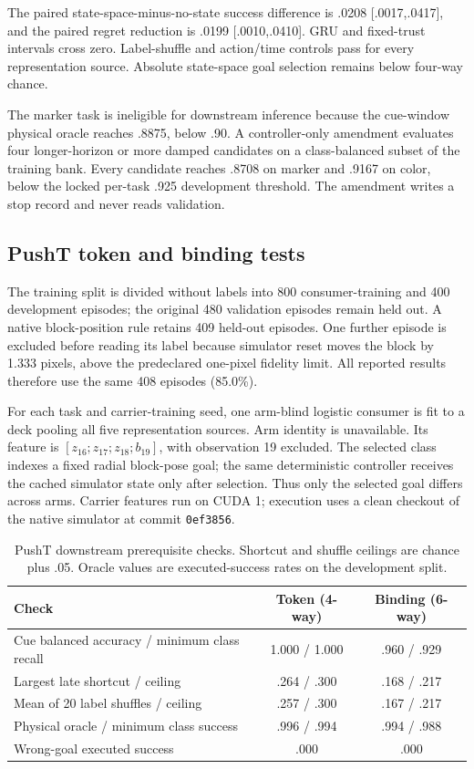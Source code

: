 The paired state-space-minus-no-state success difference is .0208 [.0017,.0417], and the paired regret reduction is .0199 [.0010,.0410]. GRU and fixed-trust intervals cross zero. Label-shuffle and action/time controls pass for every representation source. Absolute state-space goal selection remains below four-way chance.

The marker task is ineligible for downstream inference because the cue-window physical oracle reaches .8875, below .90. A controller-only amendment evaluates four longer-horizon or more damped candidates on a class-balanced subset of the training bank. Every candidate reaches .8708 on marker and .9167 on color, below the locked per-task .925 development threshold. The amendment writes a stop record and never reads validation.

\subsection{PushT token and binding tests}

The training split is divided without labels into 800 consumer-training and 400 development episodes; the original 480 validation episodes remain held out. A native block-position rule retains 409 held-out episodes. One further episode is excluded before reading its label because simulator reset moves the block by 1.333 pixels, above the predeclared one-pixel fidelity limit. All reported results therefore use the same 408 episodes (85.0\%).

For each task and carrier-training seed, one arm-blind logistic consumer is fit to a deck pooling all five representation sources. Arm identity is unavailable. Its feature is $[z_{16};z_{17};z_{18};b_{19}]$, with observation 19 excluded. The selected class indexes a fixed radial block-pose goal; the same deterministic controller receives the cached simulator state only after selection. Thus only the selected goal differs across arms. Carrier features run on CUDA 1; execution uses a clean checkout of the native simulator at commit \texttt{0ef3856}.

\begin{table}[H]
\centering
\scriptsize
\setlength{\tabcolsep}{4.2pt}
\caption{PushT downstream prerequisite checks. Shortcut and shuffle ceilings are chance plus .05. Oracle values are executed-success rates on the development split.}
\begin{tabular}{lcc}
\toprule
Check & Token (4-way) & Binding (6-way) \\
\midrule
Cue balanced accuracy / minimum class recall & 1.000 / 1.000 & .960 / .929 \\
Largest late shortcut / ceiling & .264 / .300 & .168 / .217 \\
Mean of 20 label shuffles / ceiling & .257 / .300 & .167 / .217 \\
Physical oracle / minimum class success & .996 / .994 & .994 / .988 \\
Wrong-goal executed success & .000 & .000 \\
\bottomrule
\end{tabular}
\end{table}

